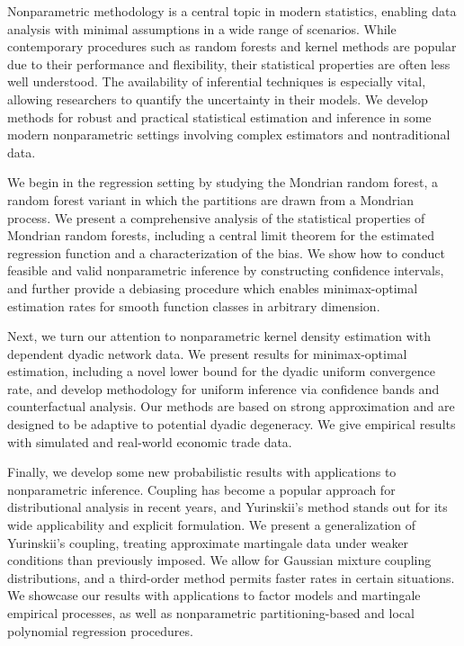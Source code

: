 

Nonparametric methodology is a central topic in modern statistics, enabling
data analysis with minimal assumptions in a wide range of scenarios.
While contemporary procedures such as random forests and kernel
methods are popular due to their performance and flexibility, their
statistical properties are often less well understood.
The availability of inferential techniques is especially vital,
allowing researchers to quantify the uncertainty in their models.
We develop methods for robust and practical statistical estimation and
inference in some modern nonparametric settings involving complex estimators
and nontraditional data.

We begin in the regression setting by studying the Mondrian random forest, a
random forest variant in which the partitions are drawn from a Mondrian
process. We
present a comprehensive analysis of the statistical properties of Mondrian
random forests, including a central limit theorem for the estimated regression
function and a characterization of the bias. We show how to conduct feasible
and valid nonparametric inference by constructing confidence intervals, and
further provide a debiasing procedure which enables minimax-optimal estimation
rates for smooth function classes in arbitrary dimension.

Next, we turn our attention to nonparametric kernel density estimation with
dependent dyadic network data. We present results for minimax-optimal
estimation, including a novel lower bound for the dyadic uniform convergence
rate, and develop methodology for uniform inference via confidence bands and
counterfactual analysis. Our methods are based on strong approximation and are
designed to be adaptive to potential dyadic degeneracy. We give empirical
results with simulated and real-world economic trade data.

Finally, we develop some new probabilistic results with applications to
nonparametric inference. Coupling has become a popular approach for
distributional analysis in recent years, and Yurinskii's method stands out
for its wide applicability and explicit formulation. We present a
generalization of Yurinskii's coupling, treating approximate martingale data
under weaker conditions than previously imposed. We allow for Gaussian mixture
coupling distributions, and a third-order method permits faster rates in certain
situations. We showcase our results with applications to factor models and
martingale empirical processes, as well as nonparametric partitioning-based and
local polynomial regression procedures.
